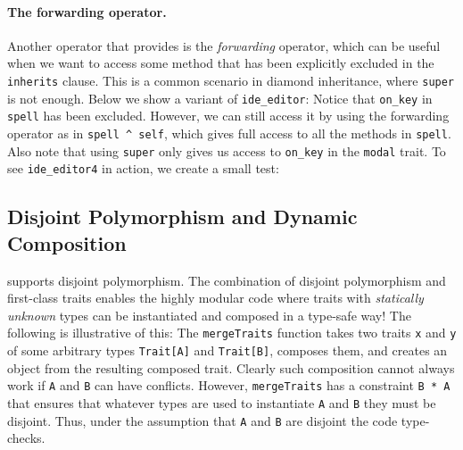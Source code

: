 \paragraph{The forwarding operator.}

Another operator that \sedel provides is the \emph{forwarding} operator, which can be useful when we want to access some method that has been
explicitly excluded in the \lstinline{inherits} clause. This is a common scenario in
diamond inheritance, where \lstinline{super} is not enough. Below we show a
variant of \lstinline{ide_editor}:
Notice that \lstinline{on_key} in \lstinline{spell} has been
excluded. However, we can
still access it by using the forwarding operator as in \lstinline{spell ^ self},
which gives full access to all the methods in \lstinline{spell}. Also note that
using \lstinline{super} only gives us access to \lstinline{on_key} in the
\lstinline{modal} trait. To see \lstinline{ide_editor4} in action, we create a
small test:




\subsection{Disjoint Polymorphism and Dynamic Composition}

\sedel supports disjoint polymorphism. The combination of disjoint
polymorphism and first-class traits enables the highly modular code
where traits with \emph{statically unknown} types can be instantiated
and composed in a type-safe way! The following is illustrative of this:
The \lstinline{mergeTraits} function takes two traits \lstinline{x} and \lstinline{y} of
some arbitrary types \lstinline{Trait[A]} and \lstinline{Trait[B]}, composes them,
and creates an object from the resulting composed trait. Clearly
such composition cannot always work if \lstinline{A} and
\lstinline{B} can have conflicts. However, \lstinline{mergeTraits} has a
constraint \lstinline{B * A} that ensures that whatever types are used
to instantiate \lstinline{A} and \lstinline{B} they must be disjoint.
Thus, under the assumption that \lstinline{A} and \lstinline{B} are
disjoint the code type-checks.


